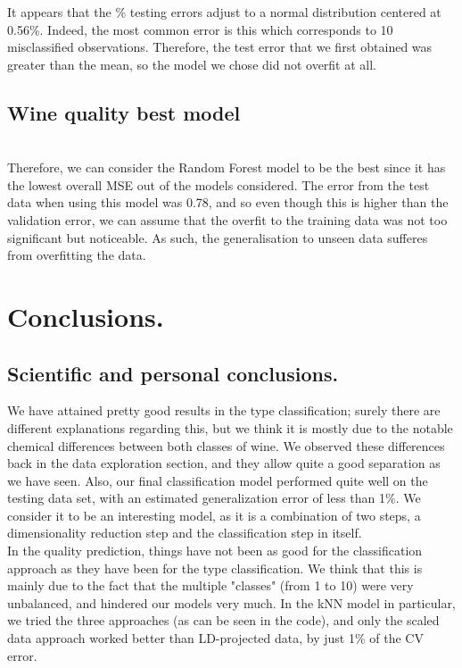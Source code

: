 \documentclass[10pt]{article}
\begin{document}
It appears that the \% testing errors adjust to a normal distribution centered at 0.56\%. Indeed, the most common error is this which corresponds to 10 misclassified observations. Therefore, the test error that we first obtained was greater than the mean, so the model we chose did not overfit at all.

\subsection{Wine quality best model}
\ \\

Therefore, we can consider the Random Forest model to be the best since it has the lowest overall MSE out of the models considered. The error from the test data when using this model was 0.78, and so even though this is higher than the validation error, we can assume that the overfit to the training data was not too significant but noticeable. As such, the generalisation to unseen data sufferes from overfitting the data.
\section{Conclusions.}
\subsection{Scientific and personal conclusions.}
We have attained pretty good results in the type classification; surely there are different explanations regarding this, but we think it is mostly due to the notable chemical differences between both classes of wine. We observed these differences back in the data exploration section, and they allow quite a good separation as we have seen. Also, our final classification model performed quite well on the testing data set, with an estimated generalization error of less than 1\%. We consider it to be an interesting model, as it is a combination of two steps, a dimensionality reduction step and the classification step in itself.\\

In the quality prediction, things have not been as good for the classification approach as they have been for the type classification. We think that this is mainly due to the fact that the multiple "classes" (from 1 to 10) were very unbalanced, and hindered our models very much. In the kNN model in particular, we tried the three approaches (as can be seen in the code), and only the scaled data approach worked better than LD-projected data, by just 1\% of the CV error. \\
\end{document}
